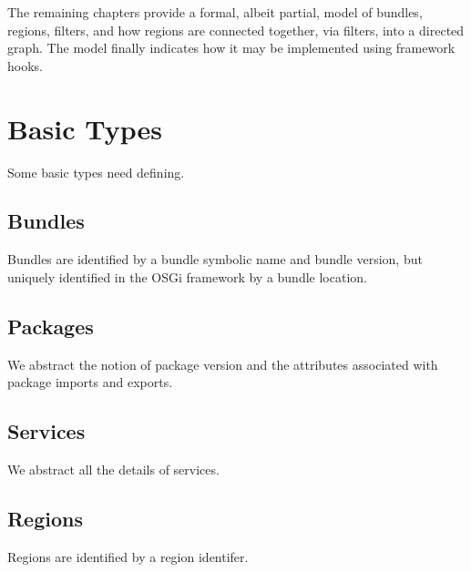 \documentclass[a4paper,9pt]{article}
\begin{document}
The remaining chapters provide a formal, albeit partial, model of bundles, regions, filters, and how
regions are connected together, via filters, into a directed graph.
The model finally indicates how it may be implemented using framework hooks.

\clearpage
\section{Basic Types}
\label{cha:basics}

Some basic types need defining.

\subsection*{Bundles}

Bundles are identified by a bundle symbolic name and bundle version, but uniquely identified in the
OSGi framework by a bundle location.
\begin{zed}
\end{zed}

\subsection*{Packages}

We abstract the notion of package version and the attributes associated with package imports and exports.
\begin{zed}
  [Package]
\end{zed}

\subsection*{Services}

We abstract all the details of services.
\begin{zed}
  [Service]
\end{zed}

\subsection*{Regions}

Regions are identified by a region identifer.
\begin{zed}
  [RId]
\end{zed}

\clearpage
\end{document}
